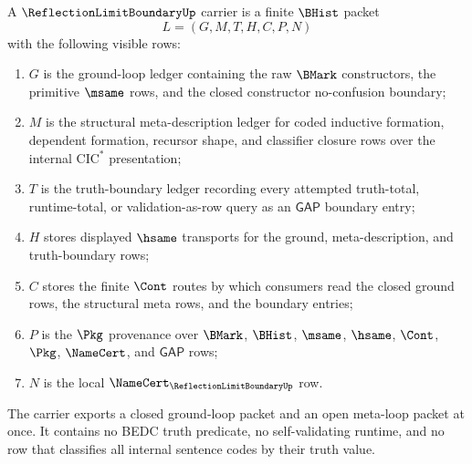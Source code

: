 \begin{definition}
\label{def:reflection-limit-boundary-carrier}
A $\ReflectionLimitBoundaryUp$ carrier is a finite $\BHist$ packet
$$
L=(G,M,T,H,C,P,N)
$$
with the following visible rows:
\begin{enumerate}
\item $G$ is the ground-loop ledger containing the raw $\BMark$ constructors, the primitive $\msame$ rows, and the closed constructor no-confusion boundary;
\item $M$ is the structural meta-description ledger for coded inductive formation, dependent formation, recursor shape, and classifier closure rows over the internal $\mathrm{CIC}^{*}$ presentation;
\item $T$ is the truth-boundary ledger recording every attempted truth-total, runtime-total, or validation-as-row query as an $\mathsf{GAP}$ boundary entry;
\item $H$ stores displayed $\hsame$ transports for the ground, meta-description, and truth-boundary rows;
\item $C$ stores the finite $\Cont$ routes by which consumers read the closed ground rows, the structural meta rows, and the boundary entries;
\item $P$ is the $\Pkg$ provenance over $\BMark$, $\BHist$, $\msame$, $\hsame$, $\Cont$, $\Pkg$, $\NameCert$, and $\mathsf{GAP}$ rows;
\item $N$ is the local $\NameCert_{\ReflectionLimitBoundaryUp}$ row.
\end{enumerate}
The carrier exports a closed ground-loop packet and an open meta-loop packet at once. It contains no BEDC truth predicate, no self-validating runtime, and no row that classifies all internal sentence codes by their truth value.
\end{definition}

